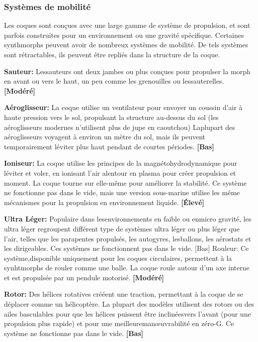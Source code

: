 \subsubsection{Systèmes de mobilité} 

Les coques sont conçues avec une large gamme de système de propulsion, et sont parfois construites pour un environnement ou une gravité spécifique. Certaines synthmorphs peuvent avoir de nombreux systèmes de mobilité. De tels systèmes sont rétractables, ils peuvent être repliés dans la structure de la coque. 

\textbf{Sauteur:} Lessauteurs ont deux jambes ou plus conçues pour propulser la morph en avant ou vers le haut, un peu comme les grenouilles ou lessauterelles. \textbf{[Modéré]} 

\textbf{Aéroglisseur:} La coque utilise un ventilateur pour envoyer un coussin d'air à haute pression vers le sol, propulsant la structure au-dessus du sol (les aéroglisseurs modernes n'utilisent plus de jupe en caoutchou) Laplupart des aéroglisseurs voyagent à environ un mètre du sol, mais ils peuvent temporairement léviter plus haut pendant de courtes périodes. \textbf{[Bas]} 

\textbf{Ioniseur:} La coque utilise les principes de la magnétohydrodynamique pour léviter et voler, en ionisant l'air alentour en plasma pour créer propulsion et moment. La coque tourne sur elle-même pour améliorer la stabilité. Ce système ne fonctionne pas dans le vide, mais une version sous-marine utilise les même mécanismes pour la propulsion en environnement liquide. \textbf{[Élevé]} 

\textbf{Ultra Léger:} Populaire dans lesenvironnements en faible ou enmicro gravité, les ultra léger regroupent différent type de systèmes ultra léger ou plus léger que l'air, telles que les parapentes propulsés, les autogyres, lesballons, les aérostats et les dirigeables. Ces systèmes ne fonctionnent pas dans le vide. [Bas] Rouleur: Ce système,disponible uniquement pour les coques circulaires, permettent à la synhtmorphs de rouler comme une balle. La coque roule autour d'un axe interne et est propulsée par un pendule motorisé. \textbf{[Modéré]} 

\textbf{Rotor:} Des hélices rotatives crééent une traction, permettant à la coque de se déplacer comme un hélicoptère. La plupart des modèles utilisent des rotors ou des ailes basculables pour que les hélices puissent être inclinéesvers l'avant (pour une propulsion plus rapide) et pour une meilleuremanœuvrabilité en zéro-G. Ce système ne fonctionne pas dans le vide. \textbf{[Bas]} 

